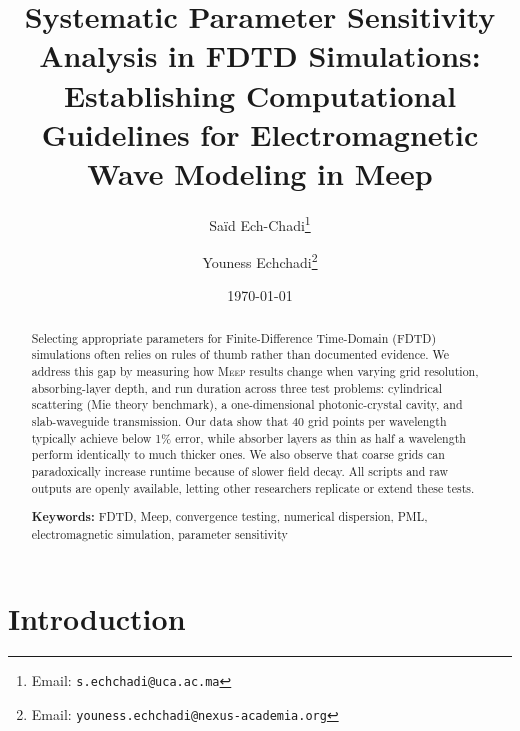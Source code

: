 \documentclass[12pt, a4paper]{article}
\newcommand{\meep}{\textsc{Meep}}
\newcommand{\fdtd}{\textsc{FDTD}}
\begin{document}
\title{%
    Systematic Parameter Sensitivity Analysis in FDTD Simulations:\\
    Establishing Computational Guidelines for Electromagnetic Wave Modeling in Meep
}

\author[1]{Sa\"id Ech-Chadi\thanks{Email: \texttt{s.echchadi@uca.ac.ma}}}
\author[2]{Youness Echchadi\thanks{Email: \texttt{youness.echchadi@nexus-academia.org}}}


\date{\today}

\maketitle

\begin{abstract}
Selecting appropriate parameters for Finite-Difference Time-Domain (\fdtd{}) simulations often relies on rules of thumb rather than documented evidence. We address this gap by measuring how \meep{} results change when varying grid resolution, absorbing-layer depth, and run duration across three test problems: cylindrical scattering (Mie theory benchmark), a one-dimensional photonic-crystal cavity, and slab-waveguide transmission. Our data show that 40 grid points per wavelength typically achieve below 1\% error, while absorber layers as thin as half a wavelength perform identically to much thicker ones. We also observe that coarse grids can paradoxically increase runtime because of slower field decay. All scripts and raw outputs are openly available, letting other researchers replicate or extend these tests.

\vspace{1em}
\noindent\textbf{Keywords:} FDTD, Meep, convergence testing, numerical dispersion, PML, electromagnetic simulation, parameter sensitivity
\end{abstract}


\section{Introduction}
\label{sec:introduction}
\end{document}
